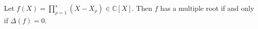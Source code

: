 Let $f(X) = \prod_{\rho=1}^{s} (X - X_\rho) \in \mathbb{C}[X]$. Then $f$ has a multiple root if and only if $\Delta(f) = 0$.
